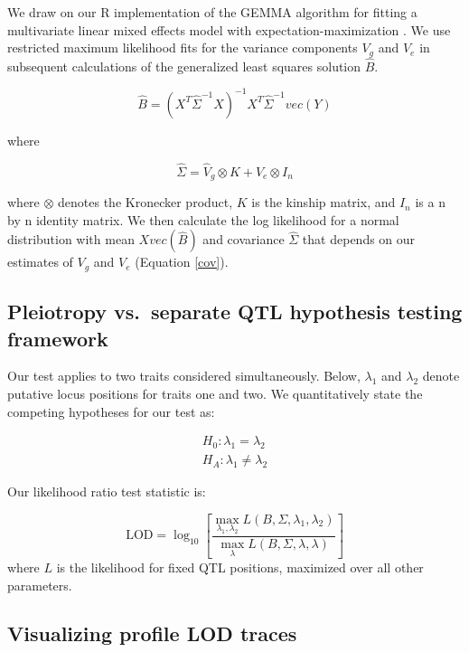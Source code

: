 \documentclass[oneside]{book}\usepackage[]{graphicx}\usepackage[]{color}
\begin{document}
We draw on our R implementation \citep{gemma2} of the
GEMMA algorithm for fitting a multivariate linear mixed effects model
with expectation-maximization \citep{zhou2014efficient}. We use
restricted maximum likelihood fits for the variance components $V_g$
and $V_e$ in subsequent calculations of the generalized least squares
solution $\hat B$.

\begin{equation}
    \hat B = (X^T\hat\Sigma^{-1}X)^{-1}X^T\hat\Sigma^{-1}vec(Y)
\end{equation}

\noindent where

\begin{equation}
    \hat\Sigma = \hat V_g \otimes K + \hat V_e \otimes I_n
    \label{cov}
\end{equation}

\noindent where $\otimes$ denotes the Kronecker product, $K$ is the
kinship matrix, and $I_n$ is a n by n
identity matrix. We then calculate the log likelihood for a normal
distribution with mean $X vec(\hat B)$ and covariance $\hat \Sigma$
that depends on our estimates of $V_g$ and $V_e$ (Equation \ref{cov}).

\subsection{Pleiotropy vs.\ separate QTL hypothesis testing framework}

Our test applies to two traits considered simultaneously. Below,
$\lambda_1$ and $\lambda_2$ denote putative locus positions for traits
one and two. We quantitatively state the competing hypotheses for our
test as:

\begin{eqnarray}
H_0: \lambda_1 = \lambda_2 \nonumber\\
H_A: \lambda_1 \neq \lambda_2
\label{eqn:hypotheses}
\end{eqnarray}

\noindent Our likelihood ratio test statistic is:

\begin{equation}
\text{LOD} = \log_{10} \left[ \frac{\max_{\lambda_1, \lambda_2} L(B, \Sigma, \lambda_1, \lambda_2)}{
    \max_\lambda L(B, \Sigma, \lambda, \lambda)} \right]
\label{eqn:test-statistic}
\end{equation}
where $L$ is the likelihood for fixed QTL positions,
maximized over all other parameters.

\subsection{Visualizing profile LOD traces}
\end{document}
